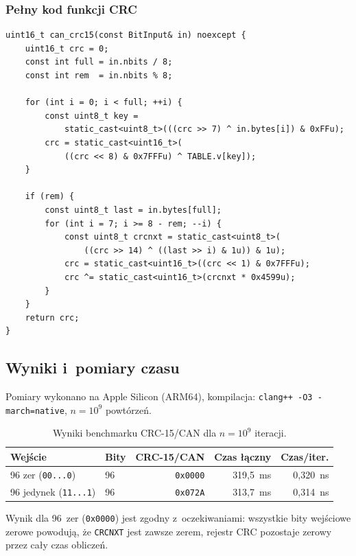 \documentclass[12pt,a4paper]{article}
\begin{document}
\subsubsection*{Pełny kod funkcji CRC}

\begin{lstlisting}
uint16_t can_crc15(const BitInput& in) noexcept {
    uint16_t crc = 0;
    const int full = in.nbits / 8;
    const int rem  = in.nbits % 8;

    for (int i = 0; i < full; ++i) {
        const uint8_t key =
            static_cast<uint8_t>(((crc >> 7) ^ in.bytes[i]) & 0xFFu);
        crc = static_cast<uint16_t>(
            ((crc << 8) & 0x7FFFu) ^ TABLE.v[key]);
    }

    if (rem) {
        const uint8_t last = in.bytes[full];
        for (int i = 7; i >= 8 - rem; --i) {
            const uint8_t crcnxt = static_cast<uint8_t>(
                ((crc >> 14) ^ ((last >> i) & 1u)) & 1u);
            crc = static_cast<uint16_t>((crc << 1) & 0x7FFFu);
            crc ^= static_cast<uint16_t>(crcnxt * 0x4599u);
        }
    }
    return crc;
}
\end{lstlisting}

\subsection*{Wyniki i~pomiary czasu}

Pomiary wykonano na Apple Silicon (ARM64), kompilacja:
\texttt{clang++ -O3 -march=native}, $n = 10^9$ powtórzeń.

\begin{table}[H]
\centering
\begin{tabular}{llrrr}
\toprule
\textbf{Wejście} & \textbf{Bity} & \textbf{CRC-15/CAN} & \textbf{Czas łączny} & \textbf{Czas/iter.} \\
\midrule
96 zer  (\texttt{00...0}) & 96 & \texttt{0x0000} & 319,5~ms & 0,320~ns \\
96 jedynek (\texttt{11...1}) & 96 & \texttt{0x072A} & 313,7~ms & 0,314~ns \\
\bottomrule
\end{tabular}
\caption{Wyniki benchmarku CRC-15/CAN dla $n = 10^9$ iteracji.}
\end{table}

Wynik dla 96~zer (\texttt{0x0000}) jest zgodny z~oczekiwaniami:
wszystkie bity wejściowe zerowe powodują, że \texttt{CRCNXT} jest zawsze
zerem, rejestr CRC pozostaje zerowy przez cały czas obliczeń.
\end{document}
